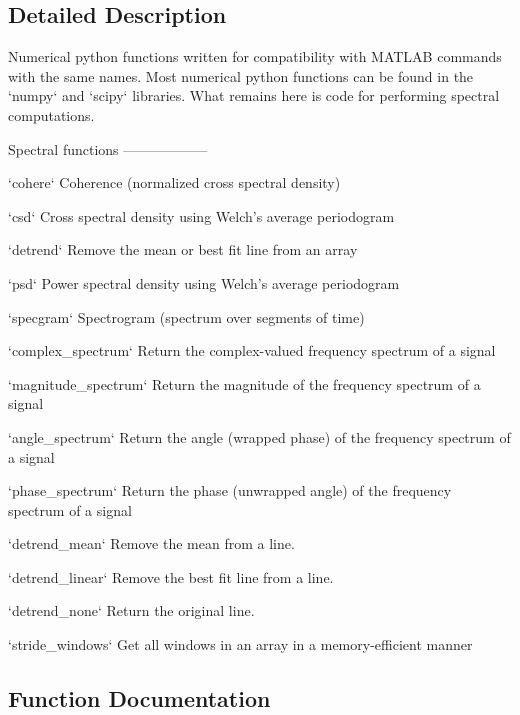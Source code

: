 \subsection{Detailed Description}
\begin{DoxyVerb}Numerical python functions written for compatibility with MATLAB
commands with the same names. Most numerical python functions can be found in
the `numpy` and `scipy` libraries. What remains here is code for performing
spectral computations.

Spectral functions
------------------

`cohere`
    Coherence (normalized cross spectral density)

`csd`
    Cross spectral density using Welch's average periodogram

`detrend`
    Remove the mean or best fit line from an array

`psd`
    Power spectral density using Welch's average periodogram

`specgram`
    Spectrogram (spectrum over segments of time)

`complex_spectrum`
    Return the complex-valued frequency spectrum of a signal

`magnitude_spectrum`
    Return the magnitude of the frequency spectrum of a signal

`angle_spectrum`
    Return the angle (wrapped phase) of the frequency spectrum of a signal

`phase_spectrum`
    Return the phase (unwrapped angle) of the frequency spectrum of a signal

`detrend_mean`
    Remove the mean from a line.

`detrend_linear`
    Remove the best fit line from a line.

`detrend_none`
    Return the original line.

`stride_windows`
    Get all windows in an array in a memory-efficient manner
\end{DoxyVerb}
 

\subsection{Function Documentation}
\mbox{\label{namespacematplotlib_1_1mlab_a95254cce5b7e87a908f947cf3ee3a3c3}} 
